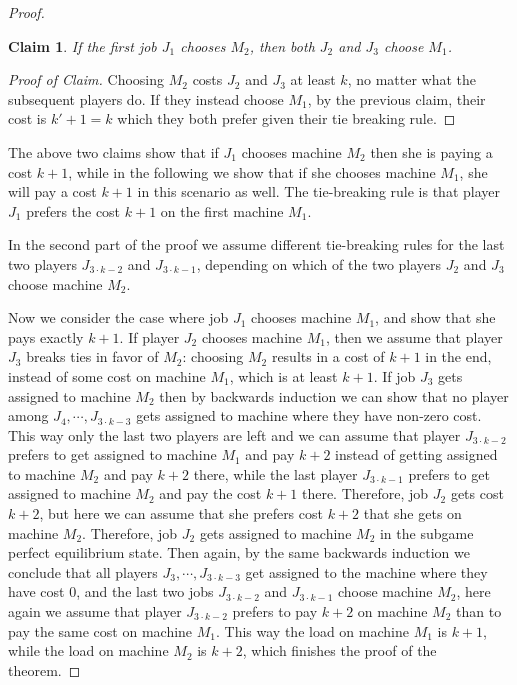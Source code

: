 \documentclass[12pt,a4paper]{article}
\newcommand{\pp}[1]{\todo[color=blue!40!white]{\scriptsize Pao: #1}}
\newtheorem{claim}[lemma]{Claim}
\theoremstyle{definition}
\theoremstyle{remark}
\begin{document}
\begin{proof}
\begin{claim}
	If the first job $J_1$ chooses $M_2$, then both $J_2$ and $J_3$ choose $M_1$.
\end{claim}
\begin{proof}[Proof of Claim] 
	Choosing $M_2$ costs $J_2$ and $J_3$ at least $k$, no matter what the subsequent players do. If they instead choose $M_1$, by the previous claim, their cost is $k'+1=k$ which they both prefer given their tie breaking rule.
\end{proof}

%
%
%

The above two claims show that if $J_1$ chooses machine $M_2$ then she is paying a cost $k+1$, while in the following we show that if she chooses machine $M_1$, she will pay a cost $k+1$ in this scenario as well. The tie-breaking rule is that player $J_1$ prefers the cost $k+1$ on the first machine $M_1$.

In the second part of the proof we assume different tie-breaking rules for the last two players $J_{3\cdot k - 2}$ and $J_{3\cdot k - 1}$, depending on which of the two players $J_2$ and $J_3$ choose machine $M_2$.

Now we consider the case where job $J_1$ chooses machine $M_1$, and show that she pays exactly $k+1$.  If player $J_2$  chooses machine $M_1$, then we assume that  player $J_3$ breaks ties in favor of $M_2$: choosing  $M_2$ results in a cost of $k+1$ in the end, instead of some cost on machine $M_1$, which is at least $k+1$. If job $J_3$ gets assigned to machine $M_2$ then by backwards induction we can show that no player among $J_4,\cdots, J_{3\cdot k-3}$ gets assigned to machine where they have non-zero cost. This way only the last two players are left and we can assume that player $J_{3\cdot k-2}$ prefers to get assigned to machine $M_1$ and pay $k+2$ instead of getting assigned  to machine $M_2$ and pay $k+2$ there, while the last player $J_{3\cdot k-1}$ prefers to get assigned to machine $M_2$ and pay the cost $k+1$ there. Therefore, job $J_2$ gets cost $k+2$, but here we can assume that she prefers cost $k+2$ that she gets on machine $M_2$. Therefore, job $J_2$  gets assigned to machine $M_2$ in the subgame perfect equilibrium state. Then again, by the same backwards induction we conclude that all players $J_3,\cdots, J_{3\cdot k-3}$ get assigned to the machine where they have cost $0$, and the last two jobs $J_{3\cdot k-2}$ and $J_{3\cdot k-1}$ choose machine $M_2$, here again we assume that player $J_{3\cdot k-2}$ prefers to pay $k+2$ on machine $M_2$ than to pay the same cost on machine $M_1$. This way the load on machine $M_1$ is $k+1$, while the load on machine $M_2$ is $k+2$, which finishes the proof of the theorem.  

\end{proof}
\end{document}
